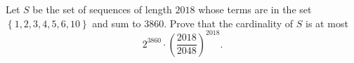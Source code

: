 Let $S$ be the set of sequences of length $2018$ whose terms are in the set $\left\{1,2,3,4,5,6,10\right\}$ and sum to $3860$. Prove that the cardinality of $S$ is at most \[2^{3860}\cdot\left(\frac{2018}{2048}\right)^{2018}.\]